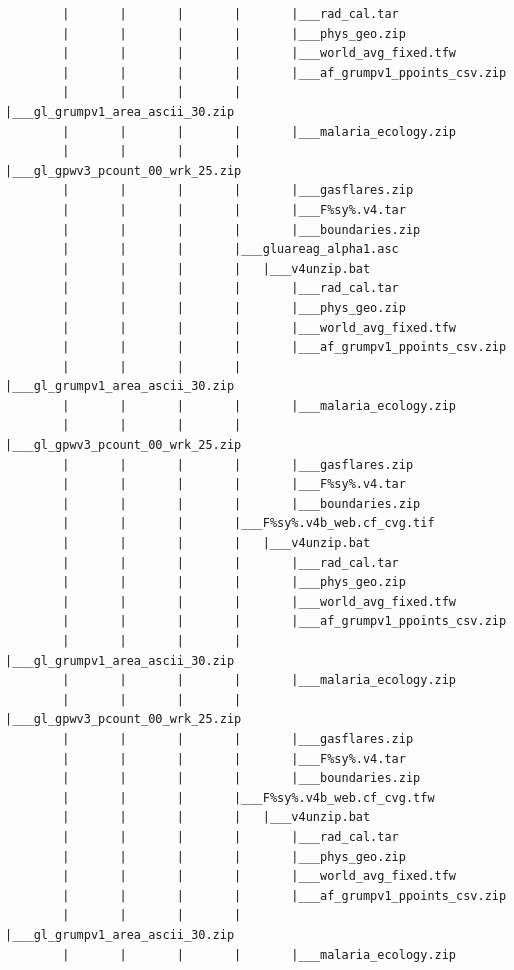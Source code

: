 \documentclass[]{book}
\begin{document}
\begin{verbatim}
        |       |       |       |       |___rad_cal.tar
        |       |       |       |       |___phys_geo.zip
        |       |       |       |       |___world_avg_fixed.tfw
        |       |       |       |       |___af_grumpv1_ppoints_csv.zip
        |       |       |       |       |___gl_grumpv1_area_ascii_30.zip
        |       |       |       |       |___malaria_ecology.zip
        |       |       |       |       |___gl_gpwv3_pcount_00_wrk_25.zip
        |       |       |       |       |___gasflares.zip
        |       |       |       |       |___F%sy%.v4.tar
        |       |       |       |       |___boundaries.zip
        |       |       |       |___gluareag_alpha1.asc
        |       |       |       |   |___v4unzip.bat
        |       |       |       |       |___rad_cal.tar
        |       |       |       |       |___phys_geo.zip
        |       |       |       |       |___world_avg_fixed.tfw
        |       |       |       |       |___af_grumpv1_ppoints_csv.zip
        |       |       |       |       |___gl_grumpv1_area_ascii_30.zip
        |       |       |       |       |___malaria_ecology.zip
        |       |       |       |       |___gl_gpwv3_pcount_00_wrk_25.zip
        |       |       |       |       |___gasflares.zip
        |       |       |       |       |___F%sy%.v4.tar
        |       |       |       |       |___boundaries.zip
        |       |       |       |___F%sy%.v4b_web.cf_cvg.tif
        |       |       |       |   |___v4unzip.bat
        |       |       |       |       |___rad_cal.tar
        |       |       |       |       |___phys_geo.zip
        |       |       |       |       |___world_avg_fixed.tfw
        |       |       |       |       |___af_grumpv1_ppoints_csv.zip
        |       |       |       |       |___gl_grumpv1_area_ascii_30.zip
        |       |       |       |       |___malaria_ecology.zip
        |       |       |       |       |___gl_gpwv3_pcount_00_wrk_25.zip
        |       |       |       |       |___gasflares.zip
        |       |       |       |       |___F%sy%.v4.tar
        |       |       |       |       |___boundaries.zip
        |       |       |       |___F%sy%.v4b_web.cf_cvg.tfw
        |       |       |       |   |___v4unzip.bat
        |       |       |       |       |___rad_cal.tar
        |       |       |       |       |___phys_geo.zip
        |       |       |       |       |___world_avg_fixed.tfw
        |       |       |       |       |___af_grumpv1_ppoints_csv.zip
        |       |       |       |       |___gl_grumpv1_area_ascii_30.zip
        |       |       |       |       |___malaria_ecology.zip

\end{verbatim}
\end{document}
